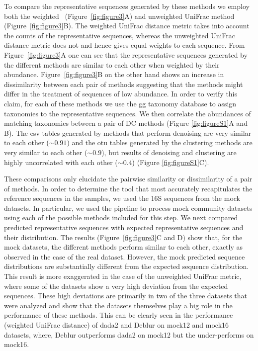   To compare the representative sequences generated by these methods we employ both the weighted~\cite{Lozupone2007} (Figure~\ref{fig:figure3}A) and unweighted UniFrac method~\cite{Lozupone2005} (Figure~\ref{fig:figure3}B).
  The weighted UniFrac distance metric takes into account the counts of the representative sequences, whereas the unweighted UniFrac distance metric does not and hence gives equal weights to each sequence.
  From Figure~\ref{fig:figure3}A one can see that the representative sequences generated by the different methods are similar to each other when weighted by their abundance.
  Figure~\ref{fig:figure3}B on the other hand shows an increase in dissimilarity between each pair of methods suggesting that the methods might differ in the treatment of sequences of low abundance.
  In order to verify this claim, for each of these methods we use the \ac{gg} taxonomy database to assign taxonomies to the representative sequences.
  We then correlate the abundances of matching taxonomies between a pair of DC methods (Figure \ref{fig:figureS1}A and B).
  The \ac{esv} tables generated by methods that perform denoising are very similar to each other ($\sim0.91$) and the \ac{otu} tables generated by the clustering methods are very similar to each other ($\sim0.9$), but results of denoising and clustering are highly uncorrelated with each other ($\sim0.4$) (Figure \ref{fig:figureS1}C).

  These comparisons only elucidate the pairwise similarity or dissimilarity of a pair of methods.
  In order to determine the tool that most accurately recapitulates the reference sequences in the samples, we used the 16S sequences from the mock datasets.
  In particular, we used the pipeline to process mock community datasets using each of the possible methods included for this step.
  We next compared predicted representative sequences with expected representative sequences and their distribution.
  The results (Figure~\ref{fig:figure3}C and D) show that, for the mock datasets, the different methods perform similar to each other, exactly as observed in the case of the real dataset. However, the mock predicted sequence distributions are substantially different from the expected sequence distribution.
  This result is more exaggerated in the case of the unweighted UniFrac metric, where some of the datasets show a very high deviation from the expected sequences.
  These high deviations are primarily in two of the three datasets that were analyzed and show that the datasets themselves play a big role in the performance of these methods.
  This can be clearly seen in the performance (weighted UniFrac distance) of \ac{dada2} and Deblur on mock12 and mock16 datasets, where, Deblur outperforms \ac{dada2} on mock12 but the under-performs on mock16.

